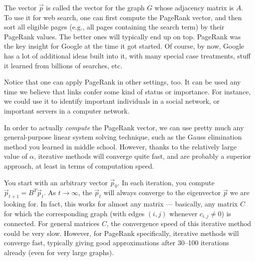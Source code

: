 The vector $\vec{p}$ is called the  vector for the
graph $G$ whose adjacency matrix is $A$. 
To use it for web search, one can first compute the PageRank vector,
and then sort all eligible pages (e.g., all pages containing the
search term) by their PageRank values. The better ones will typically
end up on top.
PageRank was the key insight for Google at the time it got started. 
Of course, by now, Google has a lot of additional ideas built into it,
with many special case treatments, stuff it learned from billions of
searches, etc. 

Notice that one can apply PageRank in other settings, too. It can be
used any time we believe that links confer some kind of status or
importance. For instance, we could use it to identify important
individuals in a social network, or important servers in a computer
network.

In order to actually \emph{compute} the PageRank vector, we can use
pretty much any general-purpose linear system solving technique, such
as the Gauss elimination method you learned in middle school.
However, thanks to the relatively large value of $\alpha$, iterative
methods will converge quite fast, and are probably a superior
approach, at least in terms of computation speed.

You start with an arbitrary vector $\vec{p}_0$. In each iteration, you
compute $\vec{p}_{t+1} = B^T \vec{p}_t$. As $t \to \infty$, the
$\vec{p}_t$ will always converge to the eigenvector $\vec{p}$ we are
looking for. In fact, this works for almost any matrix --- basically,
any matrix $C$ for which the corresponding graph (with edges $(i,j)$
whenever $c_{i,j} \neq 0$) is connected. For general matrices $C$, the
convergence speed of this iterative method could be very slow.
However, for PageRank specifically, iterative methods will converge
fast, typically giving good approximations after 30--100 iterations
already (even for very large graphs).
